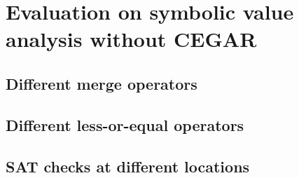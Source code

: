 \section{Evaluation on symbolic value analysis without CEGAR}
\subsection{Different merge operators}
\subsection{Different less-or-equal operators}
\subsection{SAT checks at different locations}
